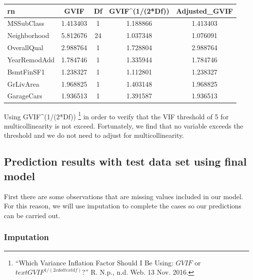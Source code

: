 \documentclass[]{article}
\newenvironment{Shaded}{\begin{snugshade}}{\end{snugshade}}
\newcommand{\KeywordTok}[1]{\textcolor[rgb]{0.13,0.29,0.53}{\textbf{{#1}}}}
\newcommand{\DataTypeTok}[1]{\textcolor[rgb]{0.13,0.29,0.53}{{#1}}}
\newcommand{\StringTok}[1]{\textcolor[rgb]{0.31,0.60,0.02}{{#1}}}
\newcommand{\NormalTok}[1]{{#1}}
\let\rmarkdownfootnote\footnote%
\def\footnote{\protect\rmarkdownfootnote}
\begin{document}
\begin{longtable}[]{@{}lcccc@{}}
\toprule
rn & GVIF & Df & GVIF\^{}(1/(2*Df)) & Adjusted\_GVIF\tabularnewline
\midrule
\endhead
MSSubClass & 1.413403 & 1 & 1.188866 & 1.413403\tabularnewline
Neighborhood & 5.812676 & 24 & 1.037348 & 1.076091\tabularnewline
OverallQual & 2.988764 & 1 & 1.728804 & 2.988764\tabularnewline
YearRemodAdd & 1.784746 & 1 & 1.335944 & 1.784746\tabularnewline
BsmtFinSF1 & 1.238327 & 1 & 1.112801 & 1.238327\tabularnewline
GrLivArea & 1.968825 & 1 & 1.403148 & 1.968825\tabularnewline
GarageCars & 1.936513 & 1 & 1.391587 & 1.936513\tabularnewline
\bottomrule
\end{longtable}

Using GVIF\^{}(1/(2*Df)) \footnote{``Which Variance Inflation Factor
  Should I Be Using: \(GVIF\) or \(text{GVIF}^{1/(2cdottext{df})}\)?''
  R. N.p., n.d. Web. 13 Nov. 2016.} in order to verify that the VIF
threshold of 5 for multicollinearity is not exceed. Fortunately, we find
that no variable exceeds the threshold and we do not need to adjust for
multicollinearity.

\subsection{Prediction results with test data set using final
model}\label{prediction-results-with-test-data-set-using-final-model}

First there are some observations that are missing values included in
our model. For this reason, we will use imputation to complete the cases
so our predictions can be carried out.

\begin{Shaded}
\end{Shaded}

\subsubsection{Imputation}\label{imputation}
\end{document}
